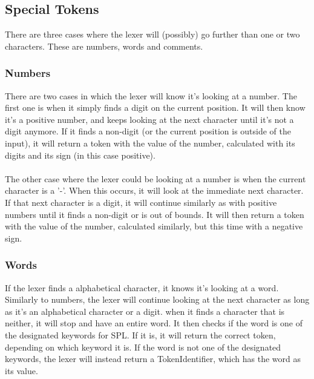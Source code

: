 \documentclass[10pt,a4paper]{article}
\begin{document}
\subsection{Special Tokens}
There are three cases where the lexer will (possibly) go further than one or two characters. These are numbers, words and comments.

\subsubsection{Numbers}
There are two cases in which the lexer will know it's looking at a number. The first one is when it simply finds a digit on the current position. It will then know it's a positive number, and keeps looking at the next character until it's not a digit anymore. If it finds a non-digit (or the current position is outside of the input), it will return a token with the value of the number, calculated with its digits and its sign (in this case positive).\\
\\
The other case where the lexer could be looking at a number is when the current character is a '-'. When this occurs, it will look at the immediate next character. If that next character is a digit, it will continue similarly as with positive numbers until it finds a non-digit or is out of bounds. It will then return a token with the value of the number, calculated similarly, but this time with a negative sign.

\subsubsection{Words}
If the lexer finds a alphabetical character, it knows it's looking at a word. Similarly to numbers, the lexer will continue looking at the next character as long as it's an alphabetical character or a digit. when it finds a character that is neither, it will stop and have an entire word. It then checks if the word is one of the designated keywords for SPL. If it is, it will return the correct token, depending on which keyword it is. If the word is not one of the designated keywords, the lexer will instead return a TokenIdentifier, which has the word as its value.
\end{document}
